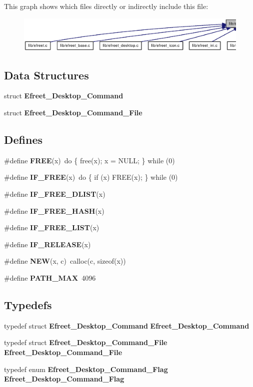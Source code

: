 This graph shows which files directly or indirectly include this file:\nopagebreak
\begin{figure}[H]
\begin{center}
\leavevmode
\includegraphics[width=420pt]{efreet__private_8h__dep__incl}
\end{center}
\end{figure}
\subsection*{Data Structures}
\begin{CompactItemize}
\item 
struct {\bf Efreet\_\-Desktop\_\-Command}
\item 
struct {\bf Efreet\_\-Desktop\_\-Command\_\-File}
\end{CompactItemize}
\subsection*{Defines}
\begin{CompactItemize}
\item 
\#define {\bf FREE}(x)~do \{ free(x); x = NULL; \} while (0)
\item 
\#define {\bf IF\_\-FREE}(x)~do \{ if (x) FREE(x); \} while (0)
\item 
\#define {\bf IF\_\-FREE\_\-DLIST}(x)
\item 
\#define {\bf IF\_\-FREE\_\-HASH}(x)
\item 
\#define {\bf IF\_\-FREE\_\-LIST}(x)
\item 
\#define {\bf IF\_\-RELEASE}(x)
\item 
\#define {\bf NEW}(x, c)~calloc(c, sizeof(x))
\item 
\#define {\bf PATH\_\-MAX}~4096
\end{CompactItemize}
\subsection*{Typedefs}
\begin{CompactItemize}
\item 
typedef struct {\bf Efreet\_\-Desktop\_\-Command} {\bf Efreet\_\-Desktop\_\-Command}
\item 
typedef struct {\bf Efreet\_\-Desktop\_\-Command\_\-File} {\bf Efreet\_\-Desktop\_\-Command\_\-File}
\item 
typedef enum {\bf Efreet\_\-Desktop\_\-Command\_\-Flag} {\bf Efreet\_\-Desktop\_\-Command\_\-Flag}
\end{CompactItemize}
